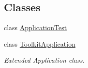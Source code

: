 \subsection*{Classes}
\begin{DoxyCompactItemize}
\item 
class \hyperlink{classorg_1_1buildmlearn_1_1toolkit_1_1ApplicationTest}{Application\+Test}
\item 
class \hyperlink{classorg_1_1buildmlearn_1_1toolkit_1_1ToolkitApplication}{Toolkit\+Application}
\begin{DoxyCompactList}\small\item\em Extended Application class. \end{DoxyCompactList}\end{DoxyCompactItemize}
